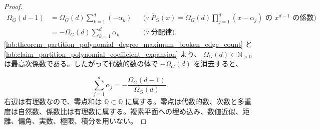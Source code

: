 \documentclass[11pt,a4paper]{article}
\theoremstyle{remark}
\begin{document}
\begin{proof}
\[\begin{aligned}
\Omega_G(d-1)
&=
\Omega_G(d)
\sum_{k=1}^{d}(-\alpha_k)
&&\bigl(\because\ \overline P_G(x)=\Omega_G(d)\prod_{j=1}^{d}(x-\alpha_j)\text{ の }x^{d-1}\text{ の係数}\bigr)\\
&=
-\Omega_G(d)
\sum_{k=1}^{d}\alpha_k
&&\bigl(\because\ \text{分配律}\bigr).
\end{aligned}\]
\cref{lab:theorem_partition_polynomial_degree_maximum_broken_edge_count}
 と 
\cref{lab:claim_partition_polynomial_coefficient_expansion}
 より、
$\Omega_G(d)\in\mathbb N_{>0}$
 は最高次係数である。したがって代数的数の体で 
$-\Omega_G(d)$
 を消去すると、

\[\sum_{j=1}^{d}\alpha_j
=
-\frac{\Omega_G(d-1)}{\Omega_G(d)}.\]
右辺は有理数なので、零点和は 
$\mathbb Q\subset\overline{\mathbb Q}$
 に属する。零点は代数的数、次数と多重度は自然数、係数比は有理数に属する。複素平面への埋め込み、数値近似、距離、偏角、実数、極限、積分を用いない。

\end{proof}
\end{document}
